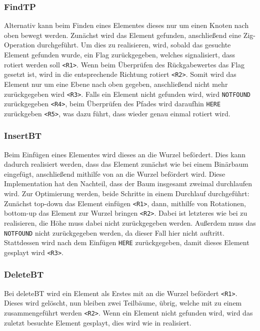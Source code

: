 \subsubsection{FindTP}
Alternativ kann beim Finden eines Elementes dieses nur um einen Knoten nach oben bewegt werden.
Zunächst wird das Element gefunden, anschließend eine Zig-Operation durchgeführt.
Um dies zu realisieren, wird, sobald das gesuchte Element gefunden wurde, ein Flag zurückgegeben,
welches signalisiert, dass rotiert werden soll \verb|<R1>|.
Wenn beim Überprüfen des Rückgabewertes das Flag gesetzt ist, wird in die entsprechende Richtung
rotiert \verb|<R2>|.
Somit wird das Element nur um eine Ebene nach oben gegeben, anschließend nicht mehr zurückgegeben
wird \verb|<R3>|.
Falls ein Element nicht gefunden wird, wird \verb|NOTFOUND| zurückgegeben \verb|<R4>|, beim
Überprüfen des Pfades wird daraufhin \verb|HERE| zurückgeben \verb|<R5>|, was dazu führt, dass
wieder genau einmal rotiert wird.

\subsubsection{InsertBT}
Beim Einfügen eines Elementes wird dieses an die Wurzel befördert.
Dies kann dadurch realisiert werden, dass das Element zunächst wie bei einem Binärbaum
eingefügt, anschließend mithilfe von  an die Wurzel befördert wird.
Diese Implementation hat den Nachteil, dass der Baum insgesamt zweimal durchlaufen wird.
Zur Optimierung werden, beide Schritte in einem Durchlauf durchgeführt: Zunächst top-down
das Element einfügen \verb|<R1>|, dann, mithilfe von Rotationen, bottom-up das Element zur Wurzel
bringen \verb|<R2>|.
Dabei ist letzteres wie bei  zu realisieren,
die Höhe muss dabei nicht zurückgegeben werden.
Außerdem muss das \verb|NOTFOUND| nicht zurückgegeben werden, da dieser Fall hier nicht auftritt.
Stattdessen wird nach dem Einfügen \verb|HERE| zurückgegeben, damit dieses Element gesplayt wird
\verb|<R3>|.

\subsubsection{DeleteBT}
Bei deleteBT wird ein Element als Erstes mit  an die Wurzel befördert
\verb|<R1>|.
Dieses wird gelöscht, nun bleiben zwei Teilbäume, übrig, welche mit  zu einem
zusammengeführt werden \verb|<R2>|.
Wenn ein Element nicht gefunden wird, wird das zuletzt besuchte Element gesplayt, dies wird wie
in  realisiert.


